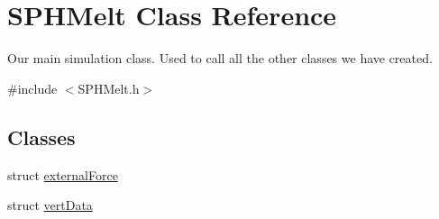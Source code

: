 \hypertarget{classSPHMelt}{\section{S\-P\-H\-Melt Class Reference}
\label{classSPHMelt}
}


Our main simulation class. Used to call all the other classes we have created.  




{\ttfamily \#include $<$S\-P\-H\-Melt.\-h$>$}

\subsection*{Classes}
\begin{DoxyCompactItemize}
\item 
struct \hyperlink{structSPHMelt_1_1externalForce}{external\-Force}
\item 
struct \hyperlink{structSPHMelt_1_1vertData}{vert\-Data}
\end{DoxyCompactItemize}
